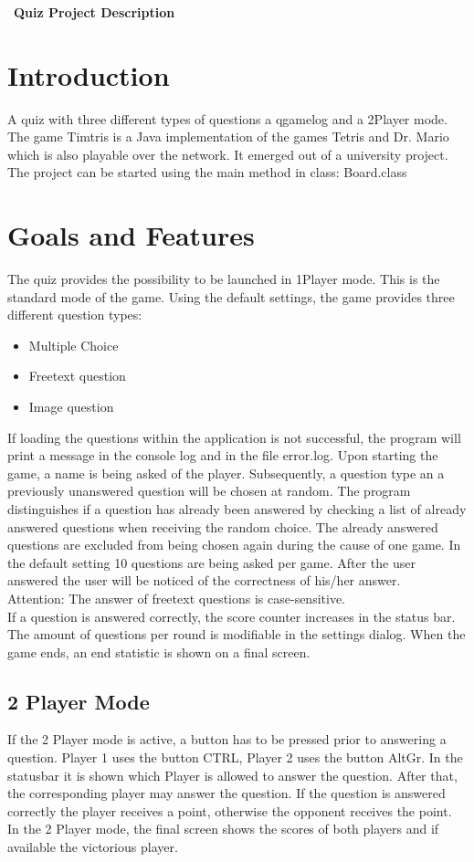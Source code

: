 \documentclass[10pt,a4paper,titlepage]{article}
\begin{document}
	\tableofcontents
	\ \\\\\\\
	\textbf{\large Quiz Project Description}\\
	\section{Introduction}
	A quiz with three different types of questions a qgamelog and a 2Player mode.
	The game Timtris is a Java implementation of the games Tetris and Dr. Mario which is also playable over the network. It emerged out of a university project.\\
	The project can be started using the main method in class: Board.class\\
	\section{Goals and Features}
	The quiz provides the possibility to be launched in 1Player mode. This is the standard mode of the game. Using the default settings, the game provides three different question types: \begin{itemize}
		\item Multiple Choice
		\item Freetext question
		\item Image question
	\end{itemize}
	If loading the questions within the application is not successful, the program will print a message in the console log and in the file error.log. Upon starting the game, a name is being asked of the player. Subsequently, a question type an a previously unanswered question will be chosen at random.
	The program distinguishes if a question has already been answered by checking a list of already answered questions when receiving the random choice. The already answered questions are excluded from being chosen again during the cause of one game. In the default setting 10 questions are being asked per game. After the user answered the user will be noticed of the correctness of his/her answer.\\Attention: The answer of freetext questions is case-sensitive.\\
	If a question is answered correctly, the score counter increases in the status bar. The amount of questions per round is modifiable in the settings dialog. When the game ends, an end statistic is shown on a final screen.
\subsection{2 Player Mode}
If the 2 Player mode is active, a button has to be pressed prior to answering a question. Player 1 uses the button CTRL, Player 2 uses the button AltGr. In the statusbar it is shown which Player is allowed to answer the question. After that, the corresponding player may answer the question. If the question is answered correctly the player receives a point, otherwise the opponent receives the point. In the 2 Player mode, the final screen shows the scores of both players and if available the victorious player.
\end{document}
